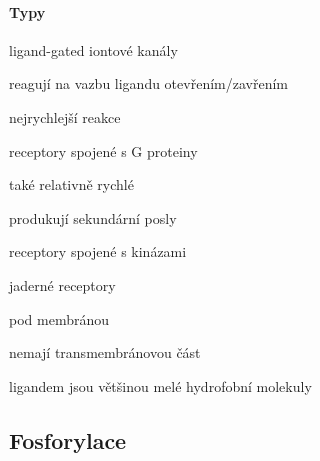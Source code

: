 \documentclass[DIV=8]{scrreprt}
\begin{document}
\paragraph{Typy}
\begin{myItemize}[nosep]
    \item ligand-gated iontové kanály
\begin{myItemize}[nosep]
    \item reagují na vazbu ligandu otevřením/zavřením
    \item nejrychlejší reakce
\end{myItemize}

    \item receptory spojené s G proteiny
\begin{myItemize}[nosep]
    \item také relativně rychlé
    \item produkují sekundární posly
\end{myItemize}

    \item receptory spojené s kinázami
    \item jaderné receptory
\begin{myItemize}[nosep]
    \item pod membránou
    \item nemají transmembránovou část
    \item ligandem jsou většinou melé hydrofobní molekuly
\end{myItemize}

\end{myItemize}



\subsection{Fosforylace} \label{Fosforylace}
\end{document}
